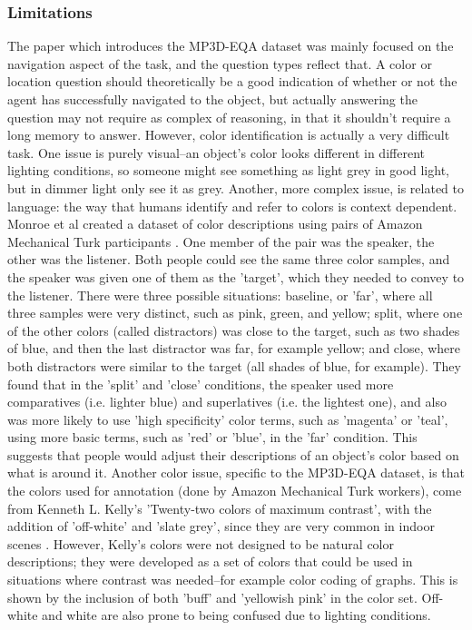\subsubsection{Limitations}
The paper which introduces the MP3D-EQA dataset was mainly focused on the navigation aspect of the task, and the question types reflect that. A color or location question should theoretically be a good indication of whether or not the agent has successfully navigated to the object, but actually answering the question may not require as complex of reasoning, in that it shouldn't require a long memory to answer. \newline
However, color identification is actually a very difficult task. One issue is purely visual--an object's color looks different in different lighting conditions, so someone might see something as light grey in good light, but in dimmer light only see it as grey. Another, more complex issue, is related to language: the way that humans identify and refer to colors is context dependent. Monroe et al created a dataset of color descriptions using pairs of Amazon Mechanical Turk participants \cite{colorsincontext}. One member of the pair was the speaker, the other was the listener. Both people could see the same three color samples, and the speaker was given one of them as the 'target', which they needed to convey to the listener. There were three possible situations: baseline, or 'far', where all three samples were very distinct, such as pink, green, and yellow; split, where one of the other colors (called distractors) was close to the target, such as two shades of blue, and then the last distractor was far, for example yellow; and close, where both distractors were similar to the target (all shades of blue, for example). They found that in the 'split' and 'close' conditions, the speaker used more comparatives (i.e. lighter blue) and superlatives (i.e. the lightest one), and also was more likely to use 'high specificity' color terms, such as 'magenta' or 'teal', using more basic terms, such as 'red' or 'blue', in the 'far' condition. This suggests that people would adjust their descriptions of an object's color based on what is around it. \newline
Another color issue, specific to the MP3D-EQA dataset, is that the colors used for annotation (done by Amazon Mechanical Turk workers), come from Kenneth L. Kelly's 'Twenty-two colors of maximum contrast', with the addition of 'off-white' and 'slate grey', since they are very common in indoor scenes \cite{kellycolors}. However, Kelly's colors were not designed to be natural color descriptions; they were developed as a set of colors that could be used in situations where contrast was needed--for example color coding of graphs.  This is shown by the inclusion of both 'buff' and 'yellowish pink' in the color set. Off-white and white are also prone to being confused due to lighting conditions.\newline

